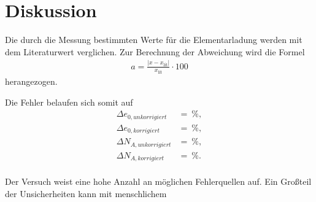 \section{Diskussion}
\label{sec:Diskussion}
Die durch die Messung bestimmten Werte für die Elementarladung werden mit dem Literaturwert \cite{Elementarladung}
verglichen. 
Zur Berechnung der Abweichung wird die Formel 
\begin{align*}
    a=\frac{|x-x_{\text{lit}}|}{x_{\text{lit}}}\cdot 100 \label{eqn:abweich}
\end{align*}
herangezogen.

Die Fehler belaufen sich somit auf
\begin{align*}
    \Delta e_{0,unkorrigiert}&= \qty{}{\percent},\\
    \Delta e_{0,korrigiert}&= \qty{}{\percent},\\
    \Delta N_{A,unkorrigiert}&=\qty{}{\percent},\\
    \Delta N_{A,korrigiert}&=\qty{}{\percent}.\\
\end{align*}

Der Versuch weist eine hohe Anzahl an möglichen Fehlerquellen auf.
Ein Großteil der Unsicherheiten kann mit menschlichem 